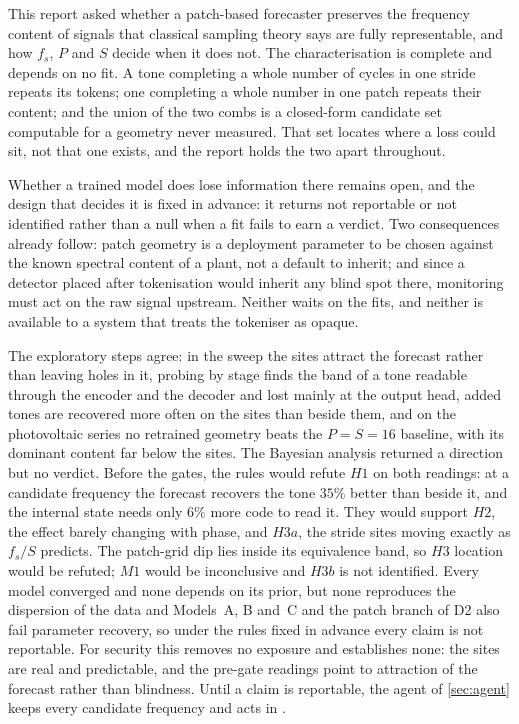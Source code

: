 This report asked whether a patch-based forecaster preserves the frequency content of signals that classical sampling theory says are fully representable, and how $f_s$, $P$ and $S$ decide when it does not. The characterisation is complete and depends on no fit. A tone completing a whole number of cycles in one stride repeats its tokens; one completing a whole number in one patch repeats their content; and the union of the two combs is a closed-form candidate set computable for a geometry never measured. That set locates where a loss could sit, not that one exists, and the report holds the two apart throughout.

Whether a trained model does lose information there remains open, and the design that decides it is fixed in advance: it returns not reportable or not identified rather than a null when a fit fails to earn a verdict. Two consequences already follow: patch geometry is a deployment parameter to be chosen against the known spectral content of a plant, not a default to inherit; and since a detector placed after tokenisation would inherit any blind spot there, monitoring must act on the raw signal upstream. Neither waits on the fits, and neither is available to a system that treats the tokeniser as opaque.

The exploratory steps agree: {\color{red}in the sweep the sites attract the forecast rather than leaving holes in it, probing by stage finds the band of a tone readable through the encoder and the decoder and lost mainly at the output head, }%
added tones are recovered more often on the sites than beside them, and on the photovoltaic series no retrained geometry beats the $P=S=16$ baseline, with its dominant content far below the sites. The Bayesian analysis returned a direction but no verdict. Before the gates, the rules would refute $H1$ on both readings: at a candidate frequency the forecast recovers the tone $35\%$ better than beside it, and the internal state needs only $6\%$ more code to read it. They would support $H2$, the effect barely changing with phase, and $H3a$, the stride sites moving exactly as $f_s/S$ predicts. The patch-grid dip lies inside its equivalence band, so $H3$ location would be refuted; $M1$ would be inconclusive and $H3b$ is not identified. Every model converged and none depends on its prior, but none reproduces the dispersion of the data and Models~A, B and~C and the patch branch of D2 also fail parameter recovery, so under the rules fixed in advance every claim is not reportable. For security this removes no exposure and establishes none: the sites are real and predictable, and the pre-gate readings point to attraction of the forecast rather than blindness. Until a claim is reportable, the agent of \autoref{sec:agent} keeps every candidate frequency  and acts in .

